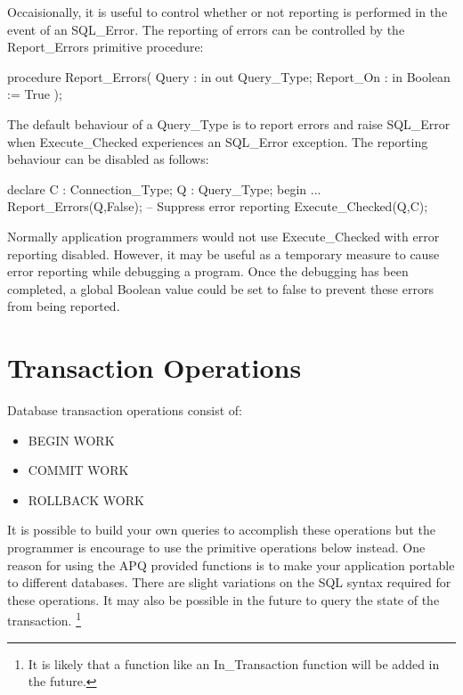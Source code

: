 \documentclass[english,letterpaper]{book}
\begin{document}
Occaisionally, it is useful to control whether or not reporting is
performed in the event of an SQL\_Error. The reporting of errors can
be controlled by the Report\_Errors primitive procedure:

\begin{Code}
procedure Report_Errors(
   Query :     in out Query_Type;
   Report_On : in     Boolean := True
);
\end{Code}

The default behaviour of a Query\_Type is to report errors and raise
SQL\_Error when Execute\_Checked experiences an SQL\_Error exception.
The reporting behaviour can be disabled as follows:

\begin{Example}
declare
   C :   Connection_Type;
   Q :   Query_Type;
begin
   ...
   Report_Errors(Q,False); -- Suppress error reporting
   Execute_Checked(Q,C);
\end{Example}

Normally application programmers would not use Execute\_Checked with
error reporting disabled. However, it may be useful as a temporary
measure to cause error reporting while debugging a program. Once the
debugging has been completed, a global Boolean value could be set
to false to prevent these errors from being reported.


\section{Transaction Operations}

Database transaction operations consist of:

\begin{itemize}
   \item BEGIN WORK
   \item COMMIT WORK
   \item ROLLBACK WORK
\end{itemize}

It is possible to build your own queries to accomplish these operations
but the programmer is encourage to use the primitive operations below
instead. One reason for using the APQ provided functions is to make
your application portable to different databases. There are slight
variations on the SQL syntax required for these operations. It may
also be possible in the future to query the state of the transaction.%
\footnote{It is likely that a function like an In\_Transaction function will
be added in the future.%
}
\end{document}
